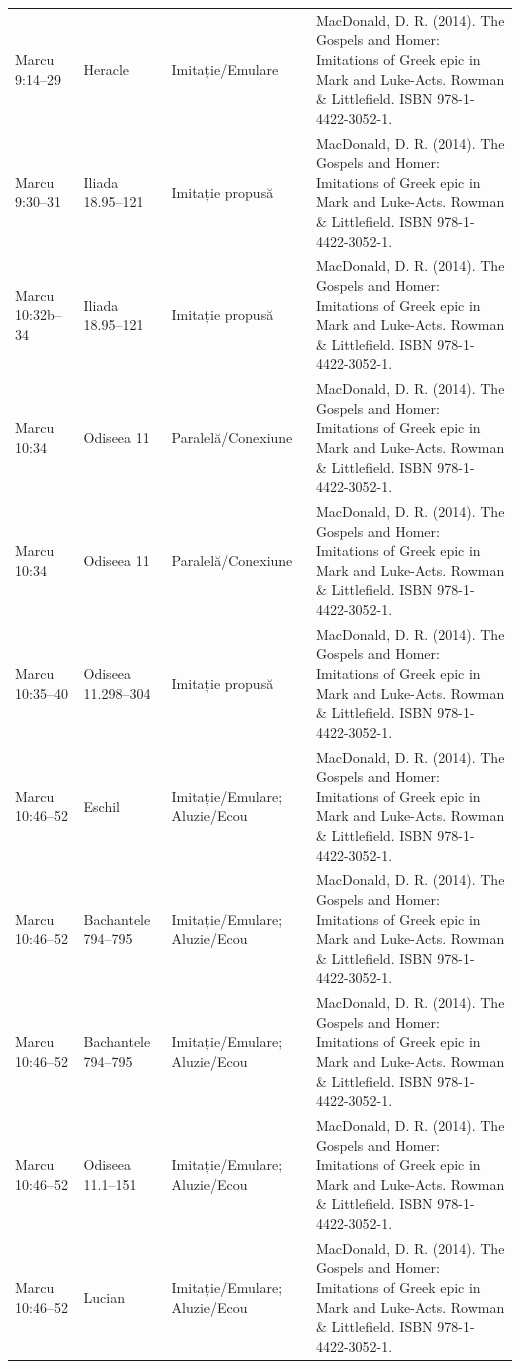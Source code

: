 \documentclass[12pt,a4paper,twoside,openany]{book}
\begin{document}
\begin{longtable}{L{1.4cm}L{1.7cm}L{3.1cm}L{8.4cm}}
Marcu 9:14–29 & Heracle & Imitație/Emulare & MacDonald, D. R. (2014). The Gospels and Homer: Imitations of Greek epic in Mark and Luke-Acts. Rowman \& Littlefield. ISBN 978-1-4422-3052-1. \\
Marcu 9:30–31 & Iliada 18.95–121 & Imitație propusă & MacDonald, D. R. (2014). The Gospels and Homer: Imitations of Greek epic in Mark and Luke-Acts. Rowman \& Littlefield. ISBN 978-1-4422-3052-1. \\
Marcu 10:32b–34 & Iliada 18.95–121 & Imitație propusă & MacDonald, D. R. (2014). The Gospels and Homer: Imitations of Greek epic in Mark and Luke-Acts. Rowman \& Littlefield. ISBN 978-1-4422-3052-1. \\
Marcu 10:34 & Odiseea 11 & Paralelă/Conexiune & MacDonald, D. R. (2014). The Gospels and Homer: Imitations of Greek epic in Mark and Luke-Acts. Rowman \& Littlefield. ISBN 978-1-4422-3052-1. \\
Marcu 10:34 & Odiseea 11 & Paralelă/Conexiune & MacDonald, D. R. (2014). The Gospels and Homer: Imitations of Greek epic in Mark and Luke-Acts. Rowman \& Littlefield. ISBN 978-1-4422-3052-1. \\
Marcu 10:35–40 & Odiseea 11.298–304 & Imitație propusă & MacDonald, D. R. (2014). The Gospels and Homer: Imitations of Greek epic in Mark and Luke-Acts. Rowman \& Littlefield. ISBN 978-1-4422-3052-1. \\
Marcu 10:46–52 & Eschil & Imitație/Emulare; Aluzie/Ecou & MacDonald, D. R. (2014). The Gospels and Homer: Imitations of Greek epic in Mark and Luke-Acts. Rowman \& Littlefield. ISBN 978-1-4422-3052-1. \\
Marcu 10:46–52 & Bachantele 794–795 & Imitație/Emulare; Aluzie/Ecou & MacDonald, D. R. (2014). The Gospels and Homer: Imitations of Greek epic in Mark and Luke-Acts. Rowman \& Littlefield. ISBN 978-1-4422-3052-1. \\
Marcu 10:46–52 & Bachantele 794–795 & Imitație/Emulare; Aluzie/Ecou & MacDonald, D. R. (2014). The Gospels and Homer: Imitations of Greek epic in Mark and Luke-Acts. Rowman \& Littlefield. ISBN 978-1-4422-3052-1. \\
Marcu 10:46–52 & Odiseea 11.1–151 & Imitație/Emulare; Aluzie/Ecou & MacDonald, D. R. (2014). The Gospels and Homer: Imitations of Greek epic in Mark and Luke-Acts. Rowman \& Littlefield. ISBN 978-1-4422-3052-1. \\
Marcu 10:46–52 & Lucian & Imitație/Emulare; Aluzie/Ecou & MacDonald, D. R. (2014). The Gospels and Homer: Imitations of Greek epic in Mark and Luke-Acts. Rowman \& Littlefield. ISBN 978-1-4422-3052-1. \\

\end{longtable}
\end{document}
